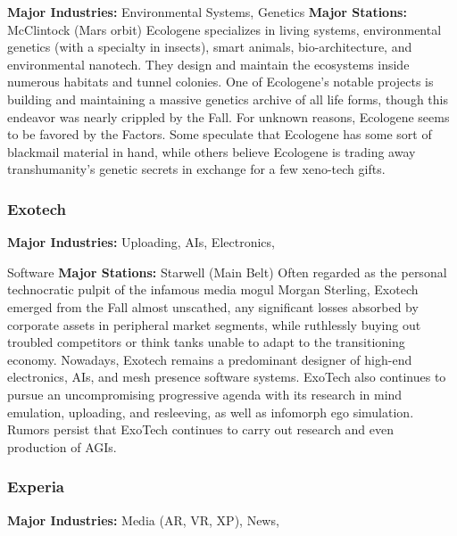 \textbf{Major Industries:} Environmental Systems, Genetics
\textbf{Major Stations:} McClintock (Mars orbit)
Ecologene specializes in living systems, environmental 
genetics (with a specialty in insects), smart animals, 
bio-architecture, and environmental nanotech. They 
design and maintain the ecosystems inside numerous 
habitats and tunnel colonies. One of Ecologene's notable
projects is building and maintaining a massive
genetics archive of all life forms, though this endeavor 
was nearly crippled by the Fall. For unknown reasons, 
Ecologene seems to be favored by the Factors. Some 
speculate that Ecologene has some sort of blackmail 
material in hand, while others believe Ecologene is 
trading away transhumanity's genetic secrets in exchange
for a few xeno-tech gifts.

\subsubsection{Exotech}

\textbf{Major Industries:} Uploading, AIs, Electronics, 

Software
\textbf{Major Stations:} Starwell (Main Belt)
Often regarded as the personal technocratic pulpit of 
the infamous media mogul Morgan Sterling, Exotech 
emerged from the Fall almost unscathed, any significant
losses absorbed by corporate assets in peripheral
market segments, while ruthlessly buying out troubled 
competitors or think tanks unable to adapt to the 
transitioning economy. Nowadays, Exotech remains a 
predominant designer of high-end electronics, AIs, and 
mesh presence software systems. ExoTech also continues
to pursue an uncompromising progressive agenda
with its research in mind emulation, uploading, and 
resleeving, as well as infomorph ego simulation. 
Rumors persist that ExoTech continues to carry out 
research and even production of AGIs.

\subsubsection{Experia}

\textbf{Major Industries:} Media (AR, VR, XP), News, 


